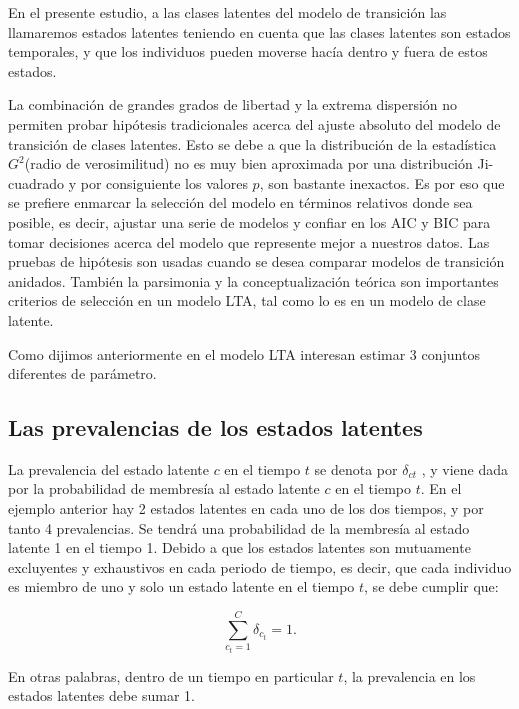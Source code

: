 			En el presente estudio, a las clases latentes del modelo de transici\'{o}n las llamaremos estados latentes teniendo en cuenta que las clases latentes son estados temporales, y que los individuos pueden moverse hac\'{i}a dentro y fuera de estos estados.
			
			La combinaci\'{o}n de grandes grados de libertad y la extrema dispersi\'{o}n no permiten probar hip\'{o}tesis tradicionales acerca del ajuste absoluto del modelo de transici\'{o}n de clases latentes. Esto se debe a que la distribuci\'{o}n de la estad\'{i}stica ${ G }^{ 2 }$(radio de verosimilitud) no es muy bien aproximada por una distribuci\'{o}n Ji-cuadrado y por consiguiente los valores $p$, son bastante inexactos. Es por eso que se prefiere enmarcar la selecci\'{o}n del modelo en t\'{e}rminos relativos donde sea posible, es decir, ajustar una serie de modelos y confiar en los AIC y BIC para tomar decisiones acerca del modelo que represente mejor a nuestros datos. Las pruebas de hip\'{o}tesis son usadas cuando se desea comparar modelos de transici\'{o}n anidados. Tambi\'{e}n la parsimonia y la conceptualizaci\'{o}n te\'{o}rica son importantes criterios de selecci\'{o}n en un modelo LTA, tal como lo es en un modelo de clase latente.
			
			Como dijimos anteriormente en el modelo LTA interesan estimar 3 conjuntos diferentes de par\'{a}metro.
		
		\subsection{Las prevalencias de los estados latentes}
			La prevalencia del estado latente $c$ en el tiempo $t$ se denota por ${\delta  }_{ ct }$ , y viene dada por la probabilidad de membres\'{i}a al estado latente $c$ en el tiempo $t$. En el ejemplo anterior hay 2 estados latentes en cada uno de los dos tiempos, y por tanto 4 prevalencias. Se tendr\'{a} una probabilidad de la membres\'{i}a al estado latente 1 en el tiempo 1.
			Debido a que los estados latentes son mutuamente excluyentes y exhaustivos en cada periodo de tiempo, es decir, que cada individuo es miembro de uno y solo un estado latente en el tiempo $t$, se debe cumplir que:
			
			\begin{equation}
				\sum_{ c_t =1 }^{C}{\delta _{c_t} } =1 .
				\label{2.18}
			\end{equation}
			
			En otras palabras, dentro de un tiempo en particular $t$, la prevalencia en los estados latentes debe sumar 1.
			
